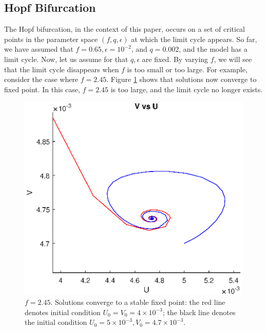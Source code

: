 \documentclass[twocolumn,amsmath,amssymb,aps]{revtex4}
\begin{document}
\subsection{Hopf Bifurcation}

The Hopf bifurcation, in the context of this paper, occurs on a set of critical points in the parameter space $(f,q,\epsilon)$ at which the limit cycle appears. So far, we have assumed that $f = 0.65, \epsilon = 10^{-2}$, and $q = 0.002$, and the model has a limit cycle. Now, let us assume for that $q,\epsilon$ are fixed. By varying $f$, we will see that the limit cycle disappears when $f$ is too small or too large. For example, consider the case where $f=2.45$. Figure \ref{fig:hopf1} shows that solutions now converge to fixed point. In this case, $f=2.45$ is too large, and the limit cycle no longer exists.
\begin{figure}[!htb]
	\centering
	\includegraphics[scale=0.6]{hopf1.eps}
	\caption{$f = 2.45$. Solutions converge to a stable fixed point: the red line denotes initial condition $U_0 =V_0 = 4\times 10^{-3}$; the black line denotes the initial condition $U_0 = 5\times 10^{-3}, V_0 = 4.7 \times 10^{-3}$.}
	\label{fig:hopf1}
\end{figure}
\end{document}
